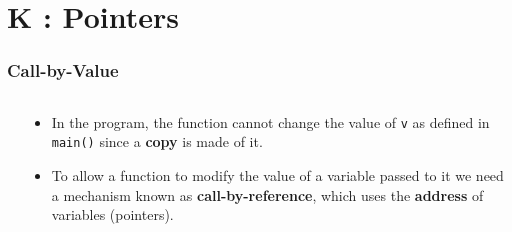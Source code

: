 \section{K : Pointers}
\label{chap:pointers}


\begin{frame}[fragile]
\frametitle{Call-by-Value}
\begin{columns}[T]

\begin{column}{0.45\textwidth}

\end{column}

\pause
\begin{column}{0.45\textwidth}
\begin{itemize}[<+->]
\item In the program, the function cannot change
the value of \verb^v^ as defined in \verb^main()^ since
a {\bf copy} is made of it.
\item To allow a function to modify the value of a variable
passed to it we need a mechanism known as
{\bf call-by-reference}, which uses the {\bf address}
of variables (pointers). 
\end{itemize}
\end{column}

\end{columns}
\end{frame}



